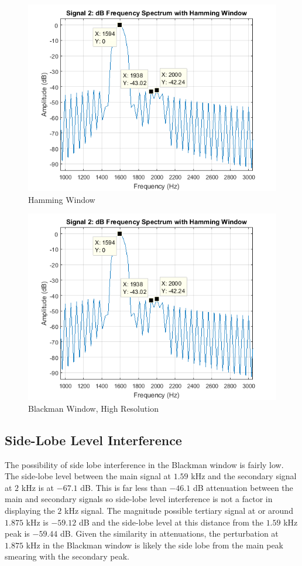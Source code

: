 \documentclass[pdftex, 10pt]{IEEEtran}
\begin{document}
\begin{figure}
    \centering
    \includegraphics[scale=0.5]{sig2_fd_hm_db_2}
    \caption{Hamming Window}
    \label{fig:sig2_fd_bm_db_2}
\end{figure}

\begin{figure}
    \centering
    \includegraphics[scale=0.5]{sig2_fd_hm_db_2}
    \caption{Blackman Window, High Resolution}
    \label{fig:sig2_fd_hm_db_2}
\end{figure}

\subsection{Side-Lobe Level Interference}
The possibility of side lobe interference in the Blackman window is fairly low. The side-lobe level between the
main signal at $1.59$ kHz and the secondary signal at $2$ kHz is at $-67.1$ dB. This is far less than $-46.1$ dB 
attenuation between the main and secondary signals so side-lobe level interference is not a factor in 
displaying the $2$ kHz signal. The magnitude possible tertiary signal at or around $1.875$ kHz is $-59.12$ dB
and the side-lobe level at this distance from the $1.59$ kHz peak is $-59.44$ dB. Given the similarity in
attenuations, the perturbation at $1.875$ kHz in the Blackman window is likely the side lobe from the 
main peak smearing with the secondary peak.
\end{document}
